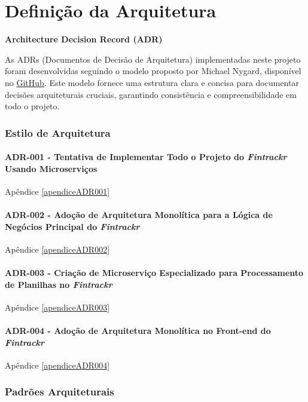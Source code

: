 \chapter{Definição da Arquitetura}

\noindent
\textbf{Architecture Decision Record (ADR)}

As ADRs (Documentos de Decisão de Arquitetura) implementadas neste projeto foram desenvolvidas seguindo o modelo proposto por Michael Nygard, disponível no \href{https://github.com/joelparkerhenderson/architecture-decision-record/blob/main/locales/en/templates/decision-record-template-by-michael-nygard/index.md}{GitHub}. Este modelo fornece uma estrutura clara e concisa para documentar decisões arquiteturais cruciais, garantindo consistência e compreensibilidade em todo o projeto.

\subsection{Estilo de Arquitetura}

\subsubsection*{ADR-001 - Tentativa de Implementar Todo o Projeto do \textit{Fintrackr} Usando Microserviços}
Apêndice \ref{apendiceADR001}

\subsubsection*{ADR-002 - Adoção de Arquitetura Monolítica para a Lógica de Negócios Principal do \textit{Fintrackr}}
Apêndice \ref{apendiceADR002}

\subsubsection*{ADR-003 - Criação de Microserviço Especializado para Processamento de Planilhas no \textit{Fintrackr}}
Apêndice \ref{apendiceADR003}

\subsubsection*{ADR-004 - Adoção de Arquitetura Monolítica no Front-end do \textit{Fintrackr}}
Apêndice \ref{apendiceADR004}

\subsection{Padrões Arquiteturais}

